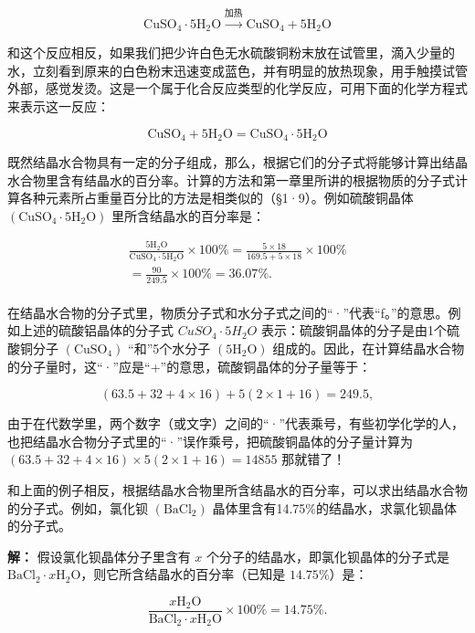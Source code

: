 \[
\mathrm{CuSO}_{4} \cdot 5 \mathrm{H}_{2} \mathrm{O} \xrightarrow {\text{加热}} \mathrm{CuSO}_{4} + 5 \mathrm{H}_{2} \mathrm{O}
\]

和这个反应相反，如果我们把少许白色无水硫酸铜粉末放在试管里，滴入少量的水，立刻看到原来的白色粉末迅速变成蓝色，并有明显的放热现象，用手触摸试管外部，感觉发烫。这是一个属于化合反应类型的化学反应，可用下面的化学方程式来表示这一反应：

\[
\mathrm{CuSO}_{4} + 5 \mathrm{H}_{2} \mathrm{O} = \mathrm{CuSO}_{4} \cdot 5 \mathrm{H}_{2} \mathrm{O}
\]

既然结晶水合物具有一定的分子组成，那么，根据它们的分子式将能够计算出结晶水合物里含有结晶水的百分率。计算的方法和第一章里所讲的根据物质的分子式计算各种元素所占重量百分比的方法是相类似的（§1·9）。例如硫酸铜晶体
\(\left(\mathrm{CuSO}_{4}\cdot5\mathrm{H}_{2}\mathrm{O}\right)\)
里所含结晶水的百分率是：

\[
\begin{array}{l} \frac {5 \mathrm{H}_{2} \mathrm{O}}{\mathrm{CuSO}_{4} \cdot 5 \mathrm{H}_{2} \mathrm{O}} \times 100 \% = \frac {5 \times 18}{169.5 + 5 \times 18} \times 100 \% \\ = \frac {90}{249.5} \times 100 \% = 36.07 \%. \\ \end{array}
\]

在结晶水合物的分子式里，物质分子式和水分子式之间的``·''代表``f。''的意思。例如上述的硫酸铝晶体的分子式
\(CuSO_{4} \cdot 5H_{2}O\) 表示：硫酸铜晶体的分子是由1个硫酸铜分子
\((\mathrm{CuSO}_{4})\) ``和''5个水分子 \((5\mathrm{H}_{2}\mathrm{O})\)
组成的。因此，在计算结晶水合物的分子量时，这``·''应是``+''的意思，硫酸铜晶体的分子量等于：

\[
(63.5 + 32 + 4 \times 16) + 5 (2 \times 1 + 16) = 249.5,
\]

由于在代数学里，两个数字（或文字）之间的``·''代表乘号，有些初学化学的人，也把结晶水合物分子式里的``·''误作乘号，把硫酸铜晶体的分子量计算为
\((63.5+32+4\times16)\times5(2\times1+16)=14855\) 那就错了！

和上面的例子相反，根据结晶水合物里所含结晶水的百分率，可以求出结晶水合物的分子式。例如，氯化钡
\(\left(\mathrm{BaCl}_{2}\right)\)
晶体里含有14.75\%的结晶水，求氯化钡晶体的分子式。

\textbf{解：} 假设氯化钡晶体分子里含有 \(x\)
个分子的结晶水，即氯化钡晶体的分子式是
\(\mathrm{BaCl}_2 \cdot x\mathrm{H}_2\mathrm{O}\)，则它所含结晶水的百分率（已知是
\(14.75\%\)）是：

\[
\frac {x \mathrm{H}_{2} \mathrm{O}}{\mathrm{BaCl}_{2} \cdot x \mathrm{H}_{2} \mathrm{O}} \times 100 \% = 14.75 \%.
\]

